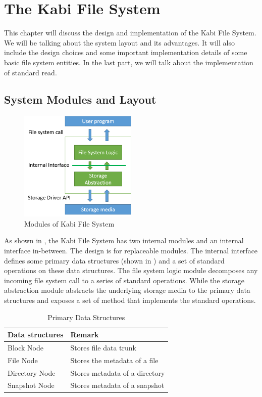\chapter{The Kabi File System}
\label{chap:fs}

This chapter will discuss the design and implementation of the Kabi File System. We will be talking about the system layout and its advantages. It will also include the design choices and some important implementation details of some basic file system entities. In the last part, we will talk about the implementation of standard read.

\section{System Modules and Layout}

\begin{figure}[hbtp]
\centering
\includegraphics[width=0.5\textwidth]{Chapter-3/figs/fig8.png}
\caption{Modules of Kabi File System}
\label{fig:modules}
\end{figure}

    As shown in , the Kabi File System has two internal modules and an internal interface in-between. The design is for replaceable modules. The internal interface defines some primary data structures (shown in ) and a set of standard operations on these data structures. The file system logic module decomposes any incoming file system call to a series of standard operations. While the storage abstraction module abstracts the underlying storage media to the primary data structures and exposes a set of method that implements the standard operations.

\begin{table}
\caption{Primary Data Structures}
\label{tab:data_struct}
\begin{center}
\begin{tabular}{ll}
\toprule
Data structures & Remark\\
\midrule
Block Node & Stores file data trunk\\
File Node & Stores the metadata of a file\\
Directory Node & Stores metadata of a directory \\
Snapshot Node & Stores metadata of a snapshot\\
\bottomrule
\end{tabular}
\end{center}
\end{table}

